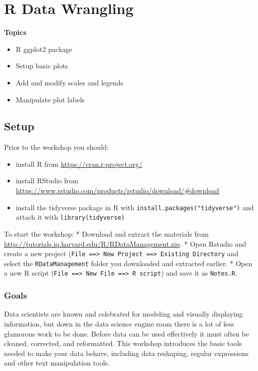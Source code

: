 \documentclass[]{book}
\providecommand{\tightlist}{%
  \setlength{\itemsep}{0pt}\setlength{\parskip}{0pt}}
\begin{document}
\chapter{R Data Wrangling}\label{r-data-wrangling}

\textbf{Topics}

\begin{itemize}
\tightlist
\item
  R ggplot2 package
\item
  Setup basic plots
\item
  Add and modify scales and legends
\item
  Manipulate plot labels
\end{itemize}

\section{Setup}\label{setup-3}

Prior to the workshop you should:

\begin{itemize}
\tightlist
\item
  install R from \url{https://cran.r-project.org/}
\item
  install RStudio from
  \url{https://www.rstudio.com/products/rstudio/download/\#download}
\item
  install the tidyverse package in R with
  \texttt{install.packages("tidyverse")} and attach it with
  \texttt{library(tidyverse)}
\end{itemize}

To start the workshop: * Download and extract the materials from
\url{http://tutorials.iq.harvard.edu/R/RDataManagement.zip}. * Open
Rstudio and create a new project
(\texttt{File\ ==\textgreater{}\ New\ Project\ ==\textgreater{}\ Existing\ Directory}
and select the \texttt{RDataManagement} folder you downloaded and
extracted earlier. * Open a new R script
(\texttt{File\ ==\textgreater{}\ New\ File\ ==\textgreater{}\ R\ script})
and save it as \texttt{Notes.R}.

\subsection{Goals}\label{goals-3}

Data scientists are known and celebrated for modeling and visually
displaying information, but down in the data science engine room there
is a lot of less glamorous work to be done. Before data can be used
effectively it must often be cleaned, corrected, and reformatted. This
workshop introduces the basic tools needed to make your data behave,
including data reshaping, regular expressions and other text
manipulation tools.
\end{document}
